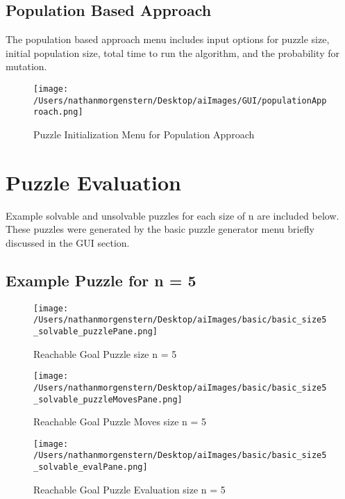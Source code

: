 \documentclass{report}
\begin{document}
\newpage	
\subsection{Population Based Approach}
The population based approach menu includes input options for puzzle size, initial population size, total time to run the algorithm, and the probability for mutation.

	\begin{figure}[H]
	\centering
	\texttt{[image: /Users/nathanmorgenstern/Desktop/aiImages/GUI/populationApproach.png]}
	\caption{Puzzle Initialization Menu for Population Approach}
	\label{fig: Puzzle Initialization Menu for Population Approach}
	\end{figure}
	
\newpage
\section{Puzzle Evaluation}

Example solvable and unsolvable puzzles for each size of n are included below. These puzzles were generated by the basic puzzle generator menu briefly discussed in the GUI section. 

\subsection{Example Puzzle for n = 5}

	\begin{figure}[H]
	\centering
	\texttt{[image: /Users/nathanmorgenstern/Desktop/aiImages/basic/basic\_size5\_solvable\_puzzlePane.png]}
	\caption{Reachable Goal Puzzle size n = 5}
	\label{fig: Basic Evaluation n = 5 reachable goal puzzle }
	\end{figure}
	
	\begin{figure}[H]
	\centering
	\texttt{[image: /Users/nathanmorgenstern/Desktop/aiImages/basic/basic\_size5\_solvable\_puzzleMovesPane.png]}
	\caption{Reachable Goal Puzzle Moves size n = 5}
	\label{fig: Basic Evaluation n = 5 reachable goal puzzle moves}
	\end{figure}
	
	\begin{figure}[H]
	\centering
	\texttt{[image: /Users/nathanmorgenstern/Desktop/aiImages/basic/basic\_size5\_solvable\_evalPane.png]}
	\caption{Reachable Goal Puzzle Evaluation size n = 5}
	\label{fig: Basic Evaluation n = 5 reachable goal puzzle evaluation}
	\end{figure}
	
\end{document}
